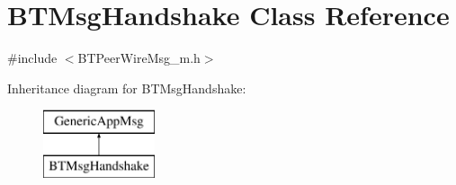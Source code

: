 \hypertarget{classBTMsgHandshake}{}\section{B\+T\+Msg\+Handshake Class Reference}
\label{classBTMsgHandshake}


{\ttfamily \#include $<$B\+T\+Peer\+Wire\+Msg\+\_\+m.\+h$>$}

Inheritance diagram for B\+T\+Msg\+Handshake\+:\begin{figure}[H]
\begin{center}
\leavevmode
\includegraphics[height=2.000000cm]{classBTMsgHandshake}
\end{center}
\end{figure}
